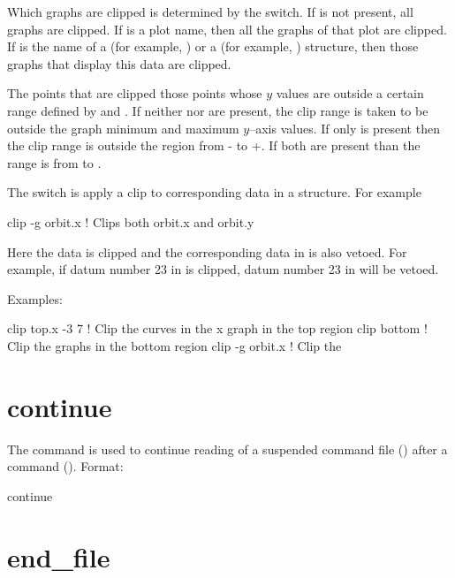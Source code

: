 \vskip 0.2in 

Which graphs are clipped is determined by the  switch. If
 is not present, all graphs are clipped. If  is a
plot name, then all the graphs of that plot are clipped. If 
is the name of a  (for example, ) or a
 (for example, ) structure, then those graphs
that display this data are clipped.

The points that are clipped those points whose $y$ values are outside
a certain range defined by  and . If neither
 nor  are present, the clip range is taken
to be outside the graph minimum and maximum $y$--axis values. If only
 is present then the clip range is outside the region
from - to +. If both are present than the
range is from  to .

The  switch is apply a clip to corresponding data in a 
structure. For example
\begin{example}
  clip -g orbit.x   ! Clips both orbit.x and orbit.y 
\end{example}
Here the  data is clipped and the corresponding data in
 is also vetoed. For example, if datum number 23 in
 is clipped, datum number 23 in  will be
vetoed.

Examples:
\begin{example}
  clip top.x -3  7  ! Clip the curves in the x graph in the top region
  clip bottom       ! Clip the graphs in the bottom region
  clip -g orbit.x   ! Clip the 
\end{example}

\section{continue}
\label{s:continue}

The  command is used to continue reading of a suspended
command file () after a  command
(). Format:
\begin{example}
  continue
\end{example}

\section{end_file} \label{s:end.file}

